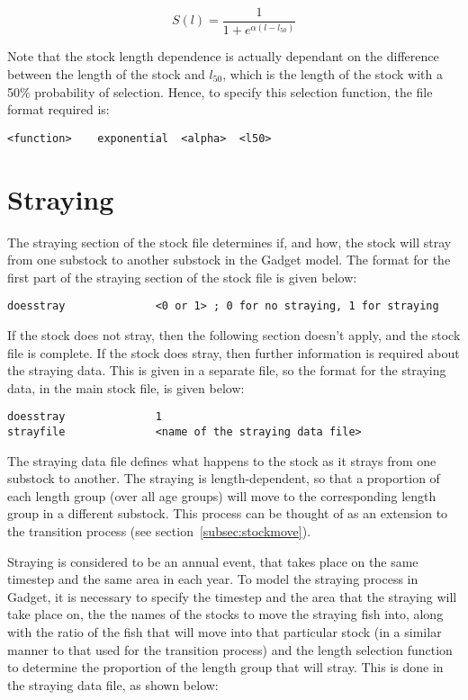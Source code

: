 \documentclass [a4paper, 10pt]{book}
\begin{document}
\begin{equation}\label{eq:expsel}
S(l) = { \frac{1}{1 + e^{ \alpha (l - l_{50})}}}
\end{equation}

\bigskip
Note that the stock length dependence is actually dependant on the difference between the length of the stock and $l_{50}$, which is the length of the stock with a 50\% probability of selection.  Hence, to specify this selection function, the file format required is:

{\small\begin{verbatim}
<function>    exponential  <alpha>  <l50>
\end{verbatim}}

\section{Straying}\label{subsec:stockstray}
The straying section of the stock file determines if, and how, the stock will stray from one substock to another substock in the Gadget model.  The format for the first part of the straying section of the stock file is given below:

{\small\begin{verbatim}
doesstray              <0 or 1> ; 0 for no straying, 1 for straying
\end{verbatim}}

If the stock does not stray, then the following section doesn't apply, and the stock file is complete.  If the stock does stray, then further information is required about the straying data.  This is given in a separate file, so the format for the straying data, in the main stock file, is given below:

{\small\begin{verbatim}
doesstray              1
strayfile              <name of the straying data file>
\end{verbatim}}

The straying data file defines what happens to the stock as it strays from one substock to another.  The straying is length-dependent, so that a proportion of each length group (over all age groups) will move to the corresponding length group in a different substock.  This process can be thought of as an extension to the transition process (see section~\ref{subsec:stockmove}).

\bigskip
Straying is considered to be an annual event, that takes place on the same timestep and the same area in each year.  To model the straying process in Gadget, it is necessary to specify the timestep and the area that the straying will take place on, the the names of the stocks to move the straying fish into, along with the ratio of the fish that will move into that particular stock (in a similar manner to that used for the transition process) and the length selection function to determine the proportion of the length group that will stray.  This is done in the straying data file, as shown below:
\end{document}
